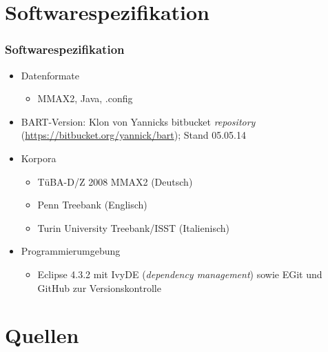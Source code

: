 \documentclass[11pt,a4paper]{beamer}
\begin{document}
\section{Softwarespezifikation}

\begin{frame}
\frametitle{Softwarespezifikation}

\begin{itemize}

	\item Datenformate
		\begin{itemize}
		\item MMAX2, Java, .config
	\end{itemize}
	\item BART-Version: Klon von Yannicks bitbucket \textit{repository} (\url{https://bitbucket.org/yannick/bart}); Stand 05.05.14 
	\item Korpora
	\begin{itemize}
		\item TüBA-D/Z 2008 MMAX2 (Deutsch)
		\item Penn Treebank (Englisch)
		\item Turin University Treebank/ISST (Italienisch)
	\end{itemize}
	\item Programmierumgebung
	\begin{itemize}
		\item Eclipse 4.3.2 mit IvyDE (\textit{dependency management}) sowie EGit und GitHub zur Versionskontrolle
	\end{itemize}

\end{itemize}

\end{frame}

\section{Quellen}
\end{document}
